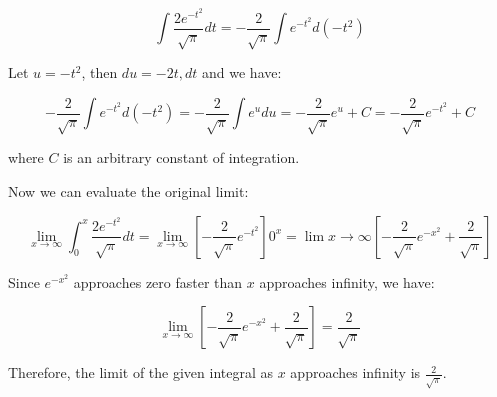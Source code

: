 \documentclass{article}
\begin{document}
$$\int \frac{2e^{-t^2}}{\sqrt{\pi}} dt = -\frac{2}{\sqrt{\pi}}\int e^{-t^2}d(-t^2)$$

Let $u = -t^2$, then $du = -2t, dt$ and we have:

$$-\frac{2}{\sqrt{\pi}}\int e^{-t^2}d(-t^2) = -\frac{2}{\sqrt{\pi}}\int e^u du = -\frac{2}{\sqrt{\pi}} e^u + C = -\frac{2}{\sqrt{\pi}} e^{-t^2} + C$$

where $C$ is an arbitrary constant of integration.

Now we can evaluate the original limit:

$$\lim_{x\to\infty} \int_{0}^{x} \frac{2e^{-t^2}}{\sqrt{\pi}} dt = \lim_{x\to\infty} \left[-\frac{2}{\sqrt{\pi}} e^{-t^2} \right]{0}^{x} = \lim{x\to\infty} \left[-\frac{2}{\sqrt{\pi}} e^{-x^2} + \frac{2}{\sqrt{\pi}} \right]$$

Since $e^{-x^2}$ approaches zero faster than $x$ approaches infinity, we have:

$$\lim_{x\to\infty} \left[-\frac{2}{\sqrt{\pi}} e^{-x^2} + \frac{2}{\sqrt{\pi}} \right] = \frac{2}{\sqrt{\pi}}$$

Therefore, the limit of the given integral as $x$ approaches infinity is $\frac{2}{\sqrt{\pi}}$.
\end{document}

